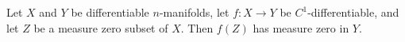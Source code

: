 Let $X$ and $Y$ be differentiable $n$-manifolds, let $f: X \to Y$ be $C^1$-differentiable, and let $Z$ be a measure zero subset of $X$. Then $f(Z)$ has measure zero in $Y$.
